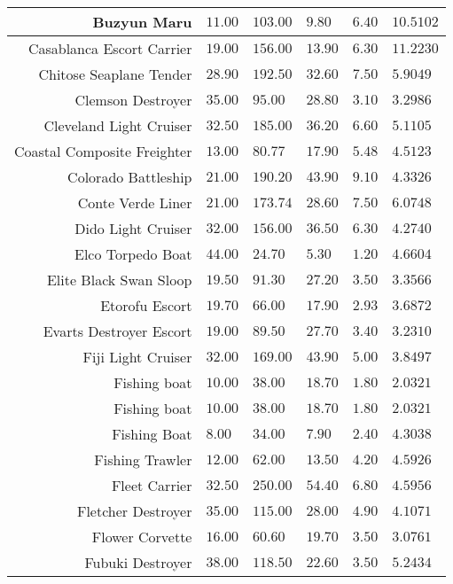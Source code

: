 \documentclass{article}
\begin{document}
\begin{tabularx}{\textwidth}{|r|l|l|l|l|X|}
\hline
Buzyun Maru & $11.00$ & $103.00$ & $9.80$ & $6.40$ & $10.5102$ \\
\hline
Casablanca Escort Carrier & $19.00$ & $156.00$ & $13.90$ & $6.30$ & $11.2230$ \\
\hline
Chitose Seaplane Tender & $28.90$ & $192.50$ & $32.60$ & $7.50$ & $5.9049$ \\
\hline
Clemson Destroyer & $35.00$ & $95.00$ & $28.80$ & $3.10$ & $3.2986$ \\
\hline
Cleveland Light Cruiser & $32.50$ & $185.00$ & $36.20$ & $6.60$ & $5.1105$ \\
\hline
Coastal Composite Freighter & $13.00$ & $80.77$ & $17.90$ & $5.48$ & $4.5123$ \\
\hline
Colorado Battleship & $21.00$ & $190.20$ & $43.90$ & $9.10$ & $4.3326$ \\
\hline
Conte Verde Liner & $21.00$ & $173.74$ & $28.60$ & $7.50$ & $6.0748$ \\
\hline
Dido Light Cruiser & $32.00$ & $156.00$ & $36.50$ & $6.30$ & $4.2740$ \\
\hline
Elco Torpedo Boat & $44.00$ & $24.70$ & $5.30$ & $1.20$ & $4.6604$ \\
\hline
Elite Black Swan Sloop & $19.50$ & $91.30$ & $27.20$ & $3.50$ & $3.3566$ \\
\hline
Etorofu Escort & $19.70$ & $66.00$ & $17.90$ & $2.93$ & $3.6872$ \\
\hline
Evarts Destroyer Escort & $19.00$ & $89.50$ & $27.70$ & $3.40$ & $3.2310$ \\
\hline
Fiji Light Cruiser & $32.00$ & $169.00$ & $43.90$ & $5.00$ & $3.8497$ \\
\hline
Fishing boat & $10.00$ & $38.00$ & $18.70$ & $1.80$ & $2.0321$ \\
\hline
Fishing boat & $10.00$ & $38.00$ & $18.70$ & $1.80$ & $2.0321$ \\
\hline
Fishing Boat & $8.00$ & $34.00$ & $7.90$ & $2.40$ & $4.3038$ \\
\hline
Fishing Trawler & $12.00$ & $62.00$ & $13.50$ & $4.20$ & $4.5926$ \\
\hline
Fleet Carrier & $32.50$ & $250.00$ & $54.40$ & $6.80$ & $4.5956$ \\
\hline
Fletcher Destroyer & $35.00$ & $115.00$ & $28.00$ & $4.90$ & $4.1071$ \\
\hline
Flower Corvette & $16.00$ & $60.60$ & $19.70$ & $3.50$ & $3.0761$ \\
\hline
Fubuki Destroyer & $38.00$ & $118.50$ & $22.60$ & $3.50$ & $5.2434$ \\

\end{tabularx}
\end{document}
